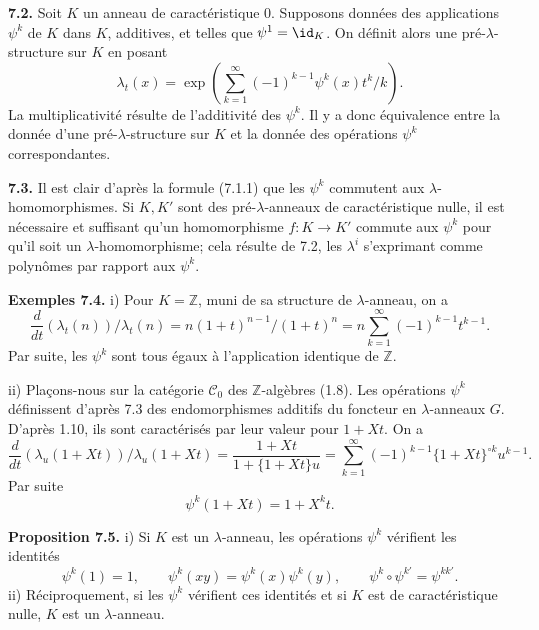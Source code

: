 \documentclass[11pt]{article}
\begin{document}
\textbf{7.2.} Soit \(K\) un anneau de caractéristique \(0\). Supposons données des applications \(\psi^k\) de \(K\) dans \(K\), additives, et telles que \(\psi^1=\id_K\). On définit alors une pré-\(\lambda\)-structure sur \(K\) en posant
\begin{equation}\tag{7.2.1}
  \lambda_t(x)=
  \exp\left(\sum_{k=1}^{\infty}(-1)^{k-1}\psi^k(x)t^k/k\right).
\end{equation}
La multiplicativité résulte de l'additivité des \(\psi^k\). Il y a donc équivalence entre la donnée d'une pré-\(\lambda\)-structure sur \(K\) et la donnée des opérations \(\psi^k\) correspondantes.

\textbf{7.3.} Il est clair d'après la formule (7.1.1) que les \(\psi^k\) commutent aux \(\lambda\)-homomorphismes. Si \(K,K'\) sont des pré-\(\lambda\)-anneaux de caractéristique nulle, il est nécessaire et suffisant qu'un homomorphisme \(f:K\to K'\) commute aux \(\psi^k\) pour qu'il soit un \(\lambda\)-homomorphisme; cela résulte de 7.2, les \(\lambda^i\) s'exprimant comme polynômes par rapport aux \(\psi^k\).

\textbf{Exemples 7.4.} i) Pour \(K=\mathbb Z\), muni de sa structure de \(\lambda\)-anneau, on a
\[
  \frac{d}{dt}(\lambda_t(n))/\lambda_t(n)
  =
  n(1+t)^{n-1}/(1+t)^n
  =
  n\sum_{k=1}^{\infty}(-1)^{k-1}t^{k-1}.
\]
Par suite, les \(\psi^k\) sont tous égaux à l'application identique de \(\mathbb Z\).

ii) Plaçons-nous sur la catégorie \(\mathscr C_0\) des \(\mathbb Z\)-algèbres (1.8). Les opérations \(\psi^k\) définissent d'après 7.3 des endomorphismes additifs du foncteur en \(\lambda\)-anneaux \(G\). D'après 1.10, ils sont caractérisés par leur valeur pour \(1+Xt\). On a
\[
  \frac{d}{dt}(\lambda_u(1+Xt))/\lambda_u(1+Xt)
  =
  \frac{1+Xt}{1+\{1+Xt\}u}
  =
  \sum_{k=1}^{\infty}(-1)^{k-1}\{1+Xt\}^{\circ k}u^{k-1}.
\]
Par suite
\begin{equation}\tag{7.4.1}
  \psi^k(1+Xt)=1+X^k t.
\end{equation}

\textbf{Proposition 7.5.} i) Si \(K\) est un \(\lambda\)-anneau, les opérations \(\psi^k\) vérifient les identités
\begin{equation}\tag{7.5.1}
  \psi^k(1)=1,\qquad
  \psi^k(xy)=\psi^k(x)\psi^k(y),\qquad
  \psi^k\circ\psi^{k'}=\psi^{kk'}.
\end{equation}
ii) Réciproquement, si les \(\psi^k\) vérifient ces identités et si \(K\) est de caractéristique nulle, \(K\) est un \(\lambda\)-anneau.
\end{document}
